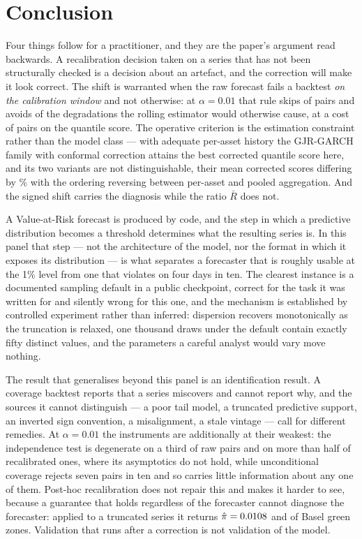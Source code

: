 \documentclass[preprint,11pt,authoryear]{elsarticle}
\newcommand{\1}{\boldsymbol{1}}
\begin{document}
\section{Conclusion}
\label{sec:conclude}
\label{sec:practitioner}

Four things follow for a practitioner, and they are the paper's argument read
backwards. A recalibration decision taken on a series that has not been
structurally checked is a decision about an artefact, and the correction will
make it look correct. The shift is warranted when the raw forecast fails a
backtest \emph{on the calibration window} and not otherwise: at $\alpha = 0.01$
that rule skips \nGateRollSkipped{} of \nSeqPairs{} pairs and avoids
\nGateRollAvoided{} of the \nDegradedRoll{} degradations the rolling estimator
would otherwise cause, at a cost of \nGateRollUpgradesLostNet{} pairs on the
quantile score. The operative criterion is the estimation constraint rather than
the model class --- with adequate per-asset history the GJR-GARCH family with
conformal correction attains the best corrected quantile score here, and its two
variants are not distinguishable, their mean corrected scores differing by
\nPairQSGapPct\% with the ordering reversing between per-asset and pooled
aggregation. And the signed shift carries the diagnosis while the ratio
$\bar R$ does not.


A Value-at-Risk forecast is produced by code, and the step in which a predictive
distribution becomes a threshold determines what the resulting series is. In this
panel that step --- not the architecture of the model, nor the format in which it
exposes its distribution --- is what separates a forecaster that is roughly
usable at the 1\% level from one that violates on four days in ten. The clearest
instance is a documented sampling default in a public checkpoint, correct for the
task it was written for and silently wrong for this one, and the mechanism is
established by controlled experiment rather than inferred: dispersion recovers
monotonically as the truncation is relaxed, one thousand draws under the default
contain exactly fifty distinct values, and the parameters a careful analyst would
vary move nothing.

The result that generalises beyond this panel is an identification result. A
coverage backtest reports that a series miscovers and cannot report why, and the
sources it cannot distinguish --- a poor tail model, a truncated predictive
support, an inverted sign convention, a misalignment, a stale vintage --- call
for different remedies. At $\alpha = 0.01$ the instruments are additionally at
their weakest: the independence test is degenerate on a third of raw pairs and on
more than half of recalibrated ones, where its asymptotics do not hold, while
unconditional coverage rejects seven pairs in ten and so carries little
information about any one of them. Post-hoc recalibration does not repair this
and makes it harder to see, because a guarantee that holds regardless of the
forecaster cannot diagnose the forecaster: applied to a truncated series it
returns $\hat\pi = 0.0108$ and \nTruncCorGreen{} of \nMainAssets{} Basel
green zones. Validation that runs after a correction is not validation of the
model.
\end{document}
